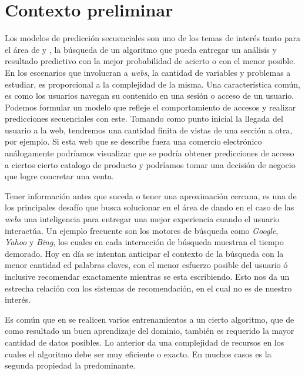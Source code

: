 
\section{Contexto preliminar}\label{sec:preliminar}

Los modelos de predicción secuenciales son uno de los temas de interés tanto para el área de \machinelearning  y \losslessdatacompression, la búsqueda de un algoritmo que pueda entregar un análisis  y resultado predictivo con la mejor probabilidad de acierto o con el menor posible.
En los escenarios que involucran a \emph{webs}, la cantidad de variables y problemas a estudiar, es proporcional a la complejidad de la misma. 
Una característica común, es como los usuarios navegan su contenido en una sesión o acceso de un usuario. Podemos formular un modelo que refleje el comportamiento de accesos y realizar predicciones secuenciales con este. Tomando como punto inicial la llegada del usuario a la web, tendremos una cantidad finita de vistas de una sección a otra, por ejemplo. Si esta web que se describe fuera una comercio electrónico análogamente podríamos visualizar que se podría obtener predicciones de acceso a ciertos cierto catalogo de producto y podríamos tomar una decisión de negocio que logre concretar una venta. 

Tener información antes que suceda o tener una aproximación cercana, es una de los principales desafío que busca solucionar en el área  de \machinelearning dando en el caso de las \emph{webs} una inteligencia para entregar una mejor experiencia cuando el usuario interactúa. Un ejemplo frecuente son los motores de búsqueda como \emph{Google}, \emph{Yahoo} y \emph{Bing}, los cuales en cada interacción de búsqueda muestran el tiempo demorado. Hoy en día se intentan anticipar el contexto de la búsqueda con la menor cantidad ed palabras claves, con el menor esfuerzo posible del usuario ó inclusive recomendar exactamente mientras se esta escribiendo. Esto nos da un estrecha relación con los sistemas de recomendación, en el cual no es de nuestro interés. 

Es común que en \machinelearning se realicen varios entrenamientos a un cierto algoritmo, que de como resultado un buen aprendizaje del dominio, también es requerido la mayor cantidad de datos posibles. Lo anterior da una complejidad de recursos en los cuales el algoritmo debe ser muy eficiente o exacto. En muchos casos es la segunda propiedad la predominante. 


